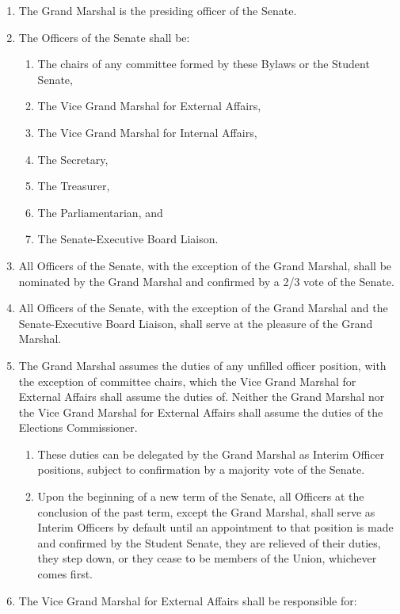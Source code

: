 
\begin{enumerate}
\item The Grand Marshal is the presiding officer of the Senate.
\item The Officers of the Senate shall be:
  \begin{enumerate}
  \item The chairs of any committee formed by these Bylaws or the Student Senate,
  \item The Vice Grand Marshal for External Affairs,
  \item The Vice Grand Marshal for Internal Affairs,
  \item The Secretary,
  \item The Treasurer,
  \item The Parliamentarian, and
  \item The Senate-Executive Board Liaison.
  \end{enumerate}
\item All Officers of the Senate, with the exception of the Grand Marshal, shall be nominated by the Grand Marshal and confirmed by a 2/3 vote of the Senate.
\item All Officers of the Senate, with the exception of the Grand Marshal and the Senate-Executive Board Liaison, shall serve at the pleasure of the Grand Marshal.
\item The Grand Marshal assumes the duties of any unfilled officer position, with the exception of committee chairs, which the Vice Grand Marshal for External Affairs shall assume the duties of. Neither the Grand Marshal nor the Vice Grand Marshal for External Affairs shall assume the duties of the Elections Commissioner.
  \begin{enumerate}
  \item These duties can be delegated by the Grand Marshal as Interim Officer positions, subject to confirmation by a majority vote of the Senate.
  \item Upon the beginning of a new term of the Senate, all Officers at the conclusion of the past term, except the Grand Marshal, shall serve as Interim Officers by default until an appointment to that position is made and confirmed by the Student Senate, they are relieved of their duties, they step down, or they cease to be members of the Union, whichever comes first.
  \end{enumerate}
\item The Vice Grand Marshal for External Affairs shall be responsible for:

\end{enumerate}
